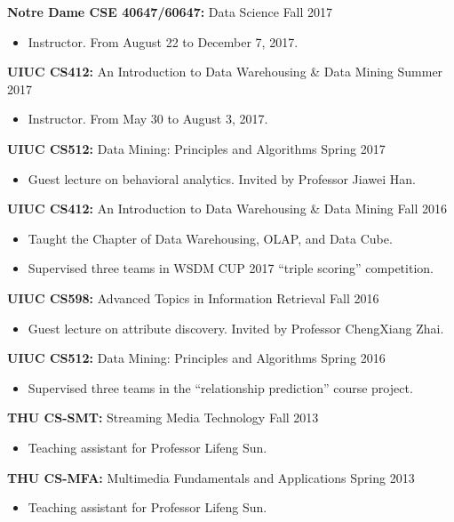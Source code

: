 \documentclass[margin, 9pt]{res}
\begin{document}
\begin{resume}
{\textbf{Notre Dame CSE 40647/60647:} Data Science} \hfill{Fall 2017}
\begin{itemize}
\item Instructor. From August 22 to December 7, 2017.
\end{itemize}
\vspace{-0.1in}
{\textbf{UIUC CS412:} An Introduction to Data Warehousing \& Data Mining} \hfill{Summer 2017}
\begin{itemize}
\item Instructor. From May 30 to August 3, 2017.
\end{itemize}
\vspace{-0.1in}
{\textbf{UIUC CS512:} Data Mining: Principles and Algorithms} \hfill{Spring 2017}
\begin{itemize}
\item Guest lecture on behavioral analytics. Invited by Professor Jiawei Han.
\end{itemize}
\vspace{-0.1in}
{\textbf{UIUC CS412:} An Introduction to Data Warehousing \& Data Mining} \hfill{Fall 2016}
\begin{itemize}
\item Taught the Chapter of Data Warehousing, OLAP, and Data Cube.
\item Supervised three teams in WSDM CUP 2017 ``triple scoring'' competition.
\end{itemize}
\vspace{-0.1in}
{\textbf{UIUC CS598:} Advanced Topics in Information Retrieval} \hfill{Fall 2016}
\begin{itemize}
\item Guest lecture on attribute discovery. Invited by Professor ChengXiang Zhai.
\end{itemize}
\vspace{-0.1in}
{\textbf{UIUC CS512:} Data Mining: Principles and Algorithms} \hfill{Spring 2016}
\begin{itemize}
\item Supervised three teams in the ``relationship prediction'' course project.
\end{itemize}
\vspace{-0.1in}
{\textbf{THU CS-SMT:} Streaming Media Technology} \hfill{Fall 2013}
\begin{itemize}
\item Teaching assistant for Professor Lifeng Sun.
\end{itemize}
\vspace{-0.1in}
{\textbf{THU CS-MFA:} Multimedia Fundamentals and Applications} \hfill{Spring 2013}
\begin{itemize}
\item Teaching assistant for Professor Lifeng Sun.
\end{itemize}


\end{resume}
\end{document}
